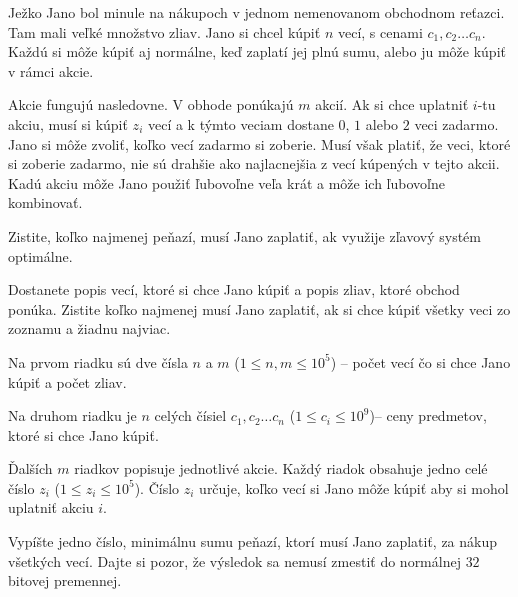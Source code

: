 




Ježko Jano bol minule na nákupoch v jednom nemenovanom obchodnom reťazci. Tam mali veľké množstvo
zliav. Jano si chcel kúpiť $n$ vecí, s cenami $c_1, c_2 \dots c_n$. Každú si môže kúpiť aj normálne,
keď zaplatí jej plnú sumu, alebo ju môže kúpiť v rámci akcie.

Akcie fungujú nasledovne. V obhode ponúkajú $m$ akcií. Ak si chce uplatniť $i$-tu akciu, musí si
kúpiť $z_i$ vecí a k týmto veciam dostane $0$, $1$ alebo $2$ veci zadarmo. Jano si môže zvoliť,
koľko vecí zadarmo si zoberie. Musí však platiť, že veci, ktoré si zoberie zadarmo, nie sú drahšie
ako najlacnejšia z vecí kúpených v tejto akcii. Kadú akciu môže Jano použiť ľubovoľne veľa krát a
môže ich ľubovoľne kombinovať.

Zistite, koľko najmenej peňazí, musí Jano zaplatiť, ak využije zľavový systém optimálne.


Dostanete popis vecí, ktoré si chce Jano kúpiť a popis zliav, ktoré obchod ponúka. Zistite koľko
najmenej musí Jano zaplatiť, ak si chce kúpiť všetky veci zo zoznamu a žiadnu najviac.


Na prvom riadku sú dve čísla $n$ a $m$ ($1 \leq n, m \leq 10^5$) -- počet vecí čo si chce Jano kúpiť
a počet zliav.

Na druhom riadku je $n$ celých čísiel $c_1, c_2 \dots c_n$ ($1 \leq c_i \leq 10^9$)-- ceny predmetov,
ktoré si chce Jano kúpiť.

Ďalších $m$ riadkov popisuje jednotlivé akcie. Každý riadok obsahuje jedno celé číslo $z_i$ ($1 \leq
z_i \leq 10^5$). Číslo $z_i$ určuje, koľko vecí si Jano môže kúpiť aby si mohol uplatniť akciu $i$.


Vypíšte jedno číslo, minimálnu sumu peňazí, ktorí musí Jano zaplatiť, za nákup všetkých vecí. Dajte
si pozor, že výsledok sa nemusí zmestiť do normálnej $32$ bitovej premennej.


\vstup
\vystup
\koniec


